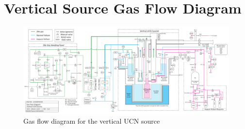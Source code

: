 \chapter{ Vertical Source Gas Flow Diagram}
\begin{figure}[h]
  \centering
    \includegraphics[width=1.05\textwidth, angle = 270]{gasflow.pdf}
    \caption{ Gas flow diagram for the vertical UCN source }
    \label{fig:gasflow}
\end{figure}